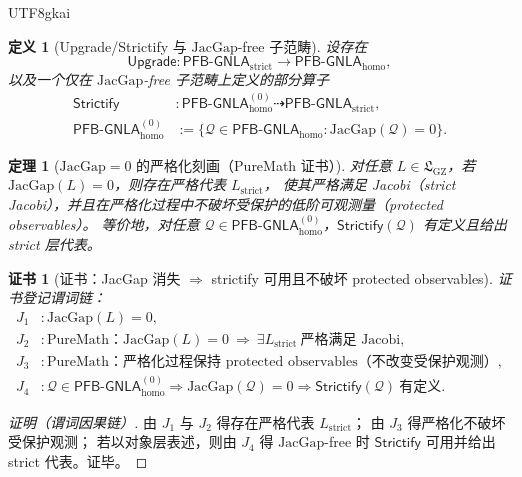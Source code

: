 \documentclass[12pt]{article}
\newtheorem{definition}{定义}[section]
\newtheorem{theorem}{定理}[section]
\newtheorem{Certificate}{证书}[section]
\newcommand{\GZLS}{\ensuremath{\mathfrak{L}_{\mathrm{GZ}}}}
\newcommand{\JacGap}{\ensuremath{\mathrm{JacGap}}} %
\begin{document}
\begin{CJK*}{UTF8}{gkai}
\begin{definition}[Upgrade/Strictify 与 $\JacGap$-free 子范畴]
\label{def:magic-wand-puremath-upgrade-strictify}
设存在
\[
  \mathsf{Upgrade}:\mathsf{PFB\text{-}GNLA}_{\mathrm{strict}}\to \mathsf{PFB\text{-}GNLA}_{\mathrm{homo}},
\]
以及一个仅在 $\JacGap$-free 子范畴上定义的部分算子
\[
  \begin{aligned}
    \mathsf{Strictify}&:\mathsf{PFB\text{-}GNLA}^{(0)}_{\mathrm{homo}}\dashrightarrow \mathsf{PFB\text{-}GNLA}
      _{\mathrm{strict}},\\
    \mathsf{PFB\text{-}GNLA}^{(0)}_{\mathrm{homo}}
    &:=
    \bigl\{\mathcal{Q}\in \mathsf{PFB\text{-}GNLA}_{\mathrm{homo}}:\JacGap(\mathcal{Q})=0\bigr\}.
  \end{aligned}
\]
\end{definition}

\begin{theorem}[$\JacGap=0$ 的严格化刻画（PureMath 证书）]
\label{thm:magic-wand-puremath-jacgap-vanishing}
对任意 $L\in\GZLS$，若 $\JacGap(L)=0$，则存在严格代表 $L_{\mathrm{strict}}$，
使其严格满足 Jacobi（strict Jacobi），并且在严格化过程中不破坏受保护的低阶可观测量（protected observables）。
等价地，对任意 $\mathcal{Q}\in \mathsf{PFB\text{-}GNLA}^{(0)}_{\mathrm{homo}}$，$\mathsf{Strictify}(\mathcal{Q})$ 有定义且给出 strict
  层代表。
\end{theorem}

\begin{Certificate}[证书：JacGap 消失 $\Rightarrow$ strictify 可用且不破坏 protected observables]
\label{cert:magic-wand-puremath-jacgap-vanishing}
证书登记谓词链：
\[
\begin{aligned}
  J_1 &: \JacGap(L)=0,\\
  J_2 &: \text{PureMath：}\JacGap(L)=0\ \Longrightarrow\ \exists L_{\mathrm{strict}}\ \text{严格满足 Jacobi},\\
  J_3 &: \text{PureMath：严格化过程保持 protected observables（不改变受保护观测）},\\
  J_4 &: \mathcal{Q}\in \mathsf{PFB\text{-}GNLA}^{(0)}_{\mathrm{homo}}\Rightarrow \JacGap(\mathcal{Q})=0\Rightarrow
    \mathsf{Strictify}(\mathcal{Q})\ \text{有定义}.
\end{aligned}
\]
\end{Certificate}

\begin{proof}[证明（谓词因果链）]
由 $J_1$ 与 $J_2$ 得存在严格代表 $L_{\mathrm{strict}}$；
由 $J_3$ 得严格化不破坏受保护观测；
若以对象层表述，则由 $J_4$ 得 $\JacGap$-free 时 $\mathsf{Strictify}$ 可用并给出 strict 代表。证毕。
\end{proof}


\end{CJK*}
\end{document}
